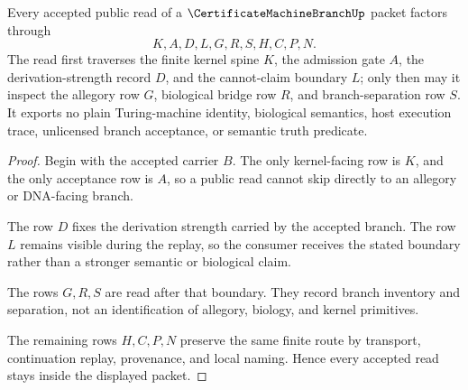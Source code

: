\begin{theorem}\label{thm:certificate-machine-branch-separation-nonescape}
Every accepted public read of a $\CertificateMachineBranchUp$ packet factors through
$$
K,A,D,L,G,R,S,H,C,P,N .
$$
The read first traverses the finite kernel spine $K$, the admission gate $A$, the derivation-strength record $D$, and the cannot-claim boundary $L$; only then may it inspect the allegory row $G$, biological bridge row $R$, and branch-separation row $S$. It exports no plain Turing-machine identity, biological semantics, host execution trace, unlicensed branch acceptance, or semantic truth predicate.
\end{theorem}
\begin{proof}
Begin with the accepted carrier $B$. The only kernel-facing row is $K$, and the only acceptance row is $A$, so a public read cannot skip directly to an allegory or DNA-facing branch.

The row $D$ fixes the derivation strength carried by the accepted branch. The row $L$ remains visible during the replay, so the consumer receives the stated boundary rather than a stronger semantic or biological claim.

The rows $G,R,S$ are read after that boundary. They record branch inventory and separation, not an identification of allegory, biology, and kernel primitives.

The remaining rows $H,C,P,N$ preserve the same finite route by transport, continuation replay, provenance, and local naming. Hence every accepted read stays inside the displayed packet.
\end{proof}




